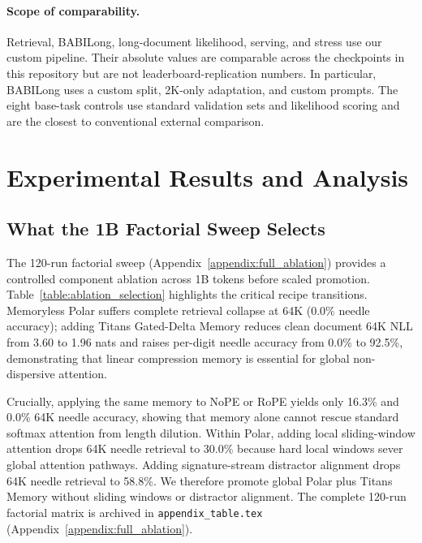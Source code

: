 \documentclass{article} %
\begin{document}
\paragraph{Scope of comparability.}
Retrieval, BABILong, long-document likelihood, serving, and stress use our custom pipeline. Their absolute values are comparable across the checkpoints in this repository but are not leaderboard-replication numbers. In particular, BABILong uses a custom split, 2K-only adaptation, and custom prompts. The eight base-task controls use standard validation sets and likelihood scoring and are the closest to conventional external comparison.

\section{Experimental Results and Analysis}

\subsection{What the 1B Factorial Sweep Selects}
The 120-run factorial sweep (Appendix~\ref{appendix:full_ablation}) provides a controlled component ablation across 1B tokens before scaled promotion. Table~\ref{table:ablation_selection} highlights the critical recipe transitions. Memoryless Polar suffers complete retrieval collapse at 64K (0.0\% needle accuracy); adding Titans Gated-Delta Memory reduces clean document 64K NLL from 3.60 to 1.96 nats and raises per-digit needle accuracy from 0.0\% to 92.5\%, demonstrating that linear compression memory is essential for global non-dispersive attention.

Crucially, applying the same memory to NoPE or RoPE yields only 16.3\% and 0.0\% 64K needle accuracy, showing that memory alone cannot rescue standard softmax attention from length dilution. Within Polar, adding local sliding-window attention drops 64K needle retrieval to 30.0\% because hard local windows sever global attention pathways. Adding signature-stream distractor alignment drops 64K needle retrieval to 58.8\%. We therefore promote global Polar plus Titans Memory without sliding windows or distractor alignment. The complete 120-run factorial matrix is archived in \texttt{appendix\_table.tex} (Appendix~\ref{appendix:full_ablation}).
\end{document}
